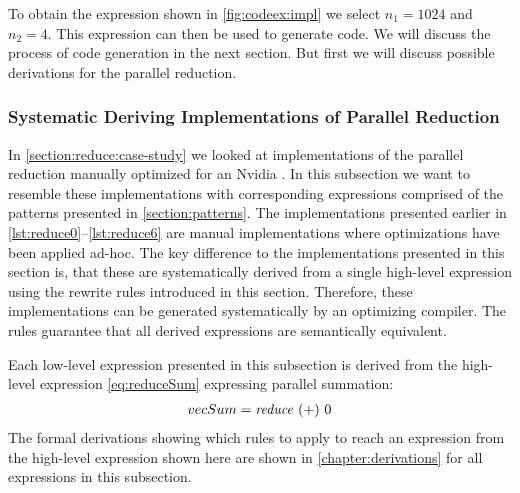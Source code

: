 To obtain the expression shown in \autoref{fig:codeex:impl} we select $n_1=1024$ and $n_2=4$.
This expression can then be used to generate \OpenCL code.
We will discuss the process of \OpenCL code generation in the next section.
But first we will discuss possible derivations for the parallel reduction.












\subsubsection{Systematic Deriving Implementations of Parallel Reduction}
\label{sec:deriving:reduce}

In \autoref{section:reduce:case-study} we looked at implementations of the parallel reduction manually optimized for an Nvidia \GPU.
In this subsection we want to resemble these implementations with corresponding expressions comprised of the patterns presented in \autoref{section:patterns}.
The implementations presented earlier in \autoref{lst:reduce0}--\autoref{lst:reduce6} are manual implementations where optimizations have been applied ad-hoc.
The key difference to the implementations presented in this section is, that these are systematically derived from a single high-level expression using the rewrite rules introduced in this section.
Therefore, these implementations can be generated systematically by an optimizing compiler.
The rules guarantee that all derived expressions are semantically equivalent.

Each \OpenCL low-level expression presented in this subsection is derived from the high-level expression \autoref{eq:reduceSum} expressing parallel summation:
\begin{align}
  vecSum = \text{\textit{reduce}}\ (+)\ 0
  \label{eq:reduceSum}
\end{align}
%
The formal derivations showing which rules to apply to reach an expression from the high-level expression shown here are shown in \autoref{chapter:derivations} for all expressions in this subsection.

